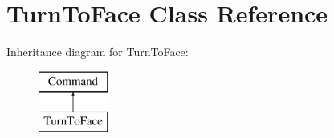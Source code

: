 \hypertarget{classTurnToFace}{\section{Turn\-To\-Face Class Reference}
\label{classTurnToFace}
}
Inheritance diagram for Turn\-To\-Face\-:\begin{figure}[H]
\begin{center}
\leavevmode
\includegraphics[height=2.000000cm]{classTurnToFace}
\end{center}
\end{figure}
